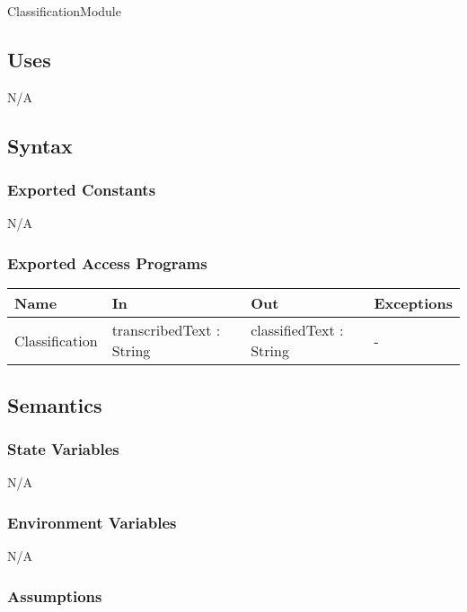 \documentclass[12pt, titlepage]{article}
\begin{document}
ClassificationModule

\subsection{Uses}

N/A

\subsection{Syntax}

\subsubsection{Exported Constants}

N/A

\subsubsection{Exported Access Programs}

\begin{center}
  \begin{tabular}{p{2.5cm} p{4cm} p{4cm} p{3cm}}  %
  \hline
  \textbf{Name} & \textbf{In} & \textbf{Out} & \textbf{Exceptions} \\
  \hline
  Classification & transcribedText : String & classifiedText : String & - \\
  \hline
  \end{tabular}
  \end{center}

\subsection{Semantics}

\subsubsection{State Variables}

N/A

\subsubsection{Environment Variables}

N/A

\subsubsection{Assumptions}
\end{document}

